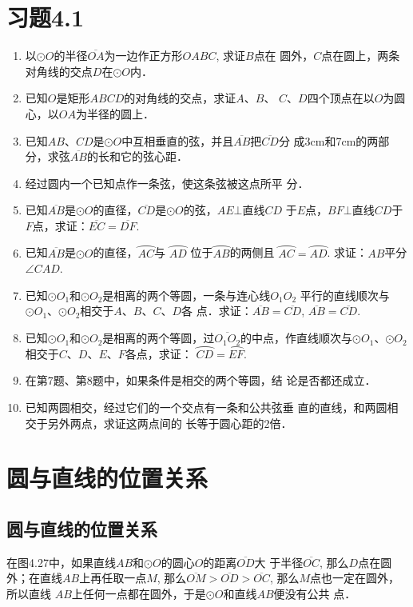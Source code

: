 \section*{习题4.1}
\begin{enumerate}
\item 以$\odot O$的半径$\overline{OA}$为一边作正方形$OABC$, 求证$B$点在
圆外，$C$点在圆上，两条对角线的交点$D$在$\odot O$内．
\item 已知$O$是矩形$ABCD$的对角线的交点，求证$A$、$B$、
$C$、$D$四个顶点在以$O$为圆心，以$OA$为半径的圆上．
\item 已知$AB$、$CD$是$\odot O$中互相垂直的弦，并且$\overline{AB}$把$\overline{CD}$分
成3cm和7cm的两部分，求弦$\overline{AB}$的长和它的弦心距．
\item 经过圆内一个已知点作一条弦，使这条弦被这点所平
分．
\item 已知$\overline{AB}$是$\odot O$的直径，$\overline{CD}$是$\odot O$的弦，$AE\bot $直线$CD$
于$E$点，$BF\bot $直线$CD$于$F$点，求证：$\overline{EC}=\overline{DF}$.
\item 已知$\overline{AB}$是$\odot O$的直径，$\wideparen{AC}$与
$\wideparen{AD}$
位于$\wideparen{AB}$的两侧且
$\wideparen{AC}=\wideparen{AD}$. 求证：$AB$平分$\angle CAD$.
\item 已知$\odot O_1$和$\odot O_2$是相离的两个等圆，一条与连心线$O_1O_2$
平行的直线顺次与$\odot O_1$、$\odot O_2$相交于$A$、$B$、$C$、$D$各
点．求证：$\overline{AB}=\overline{CD}$, $\overline{AB}=\overline{CD}$.
\item 已知$\odot O_1$和$\odot O_2$是相离的两个等圆，过$\overline{O_1O_2}$的中点，作直线顺次与$\odot O_1$、$\odot O_2$相交于$C$、$D$、$E$、$F$各点，求证：
$\wideparen{CD}=\wideparen{EF}$.
\item 在第7题、第8题中，如果条件是相交的两个等圆，结
论是否都还成立．
\item 已知两圆相交，经过它们的一个交点有一条和公共弦垂
直的直线，和两圆相交于另外两点，求证这两点间的
长等于圆心距的2倍．
\end{enumerate}

\section{圆与直线的位置关系}
\subsection{圆与直线的位置关系}
在图4.27中，如果直线$AB$和$\odot O$的圆心$O$的距离$\overline{OD}$大
于半径$\overline{OC}$, 那么$D$点在圆外；在直线${AB}$上再任取一点$M$, 
那么$\overline{OM}>\overline{OD}>\overline{OC}$, 那么$M$点也一定在圆外，所以直线
$AB$上任何一点都在圆外，于是$\odot O$和直线$AB$便没有公共
点．

